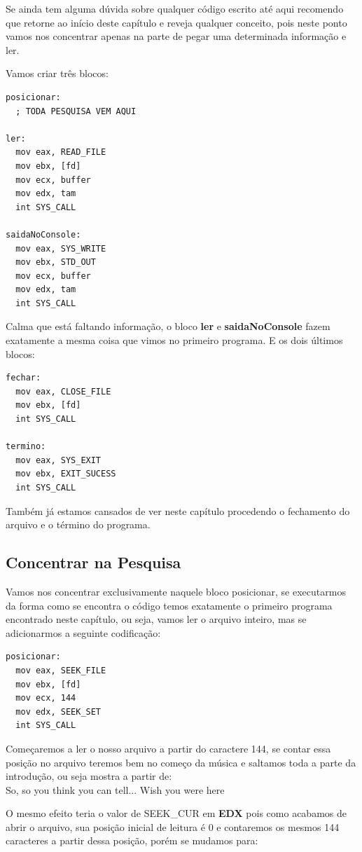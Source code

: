 Se ainda tem alguma dúvida sobre qualquer código escrito até aqui recomendo que retorne ao início deste capítulo e reveja qualquer conceito, pois neste ponto vamos nos concentrar apenas na parte de pegar uma determinada informação e ler.

Vamos criar três blocos:
\begin{lstlisting}[]
posicionar:
  ; TODA PESQUISA VEM AQUI

ler:
  mov eax, READ_FILE
  mov ebx, [fd]
  mov ecx, buffer
  mov edx, tam
  int SYS_CALL

saidaNoConsole:
  mov eax, SYS_WRITE
  mov ebx, STD_OUT
  mov ecx, buffer
  mov edx, tam
  int SYS_CALL
\end{lstlisting}	

Calma que está faltando informação, o bloco \textbf{ler} e \textbf{saidaNoConsole} fazem exatamente a mesma coisa que vimos no primeiro programa. E os dois últimos blocos:
\begin{lstlisting}[]
fechar:
  mov eax, CLOSE_FILE
  mov ebx, [fd]
  int SYS_CALL

termino:
  mov eax, SYS_EXIT
  mov ebx, EXIT_SUCESS
  int SYS_CALL
\end{lstlisting}

Também já estamos cansados de ver neste capítulo procedendo o fechamento do arquivo e o término do programa.

\subsection{Concentrar na Pesquisa}
Vamos nos concentrar exclusivamente naquele bloco posicionar, se executarmos da forma como se encontra o código temos exatamente o primeiro programa encontrado neste capítulo, ou seja, vamos ler o arquivo inteiro, mas se adicionarmos a seguinte codificação:
\begin{lstlisting}[]
posicionar:
  mov eax, SEEK_FILE
  mov ebx, [fd]
  mov ecx, 144
  mov edx, SEEK_SET
  int SYS_CALL
\end{lstlisting}

Começaremos a ler o nosso arquivo a partir do caractere 144, se contar essa posição no arquivo teremos bem no começo da música e saltamos toda a parte da introdução, ou seja mostra a partir de: \\
{\ttfamily So, so you think you can tell... Wish you were here}

O mesmo efeito teria o valor de SEEK\_CUR em \textbf{EDX} pois como acabamos de abrir o arquivo, sua posição inicial de leitura é 0 e contaremos os mesmos 144 caracteres a partir dessa posição, porém se mudamos para:

